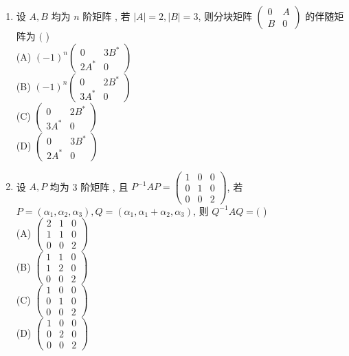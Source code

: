 \documentclass[10pt]{article}
\begin{document}
{\begin{enumerate}
  \item  设  $A, B$  均为  $n$  阶矩阵 ,  若  $|A|=2,|B|=3$,  则分块矩阵  $\left(\begin{array}{cc}0 & A \\ B & 0\end{array}\right)$  的伴随矩阵为  $($ )\\
(A) $(-1)^{n}\left(\begin{array}{cc}0 & 3 B^{*} \\ 2 A^{*} & 0\end{array}\right)$\\
(B) $(-1)^{n}\left(\begin{array}{cc}0 & 2 B^{*} \\ 3 A^{*} & 0\end{array}\right)$\\
(C) $\left(\begin{array}{cc}0 & 2 B^{*} \\ 3 A^{*} & 0\end{array}\right)$\\
(D) $\left(\begin{array}{cc}0 & 3 B^{*} \\ 2 A^{*} & 0\end{array}\right)$

  \item  设  $A, P$  均为  3  阶矩阵 ,  且  $P^{-1} A P=\left(\begin{array}{lll}1 & 0 & 0 \\ 0 & 1 & 0 \\ 0 & 0 & 2\end{array}\right)$,  若  $P=\left(\alpha_{1}, \alpha_{2}, \alpha_{3}\right), Q=\left(\alpha_{1}, \alpha_{1}+\alpha_{2}, \alpha_{3}\right)$,  则  $Q^{-1} A Q=($ )\\
(A) $\left(\begin{array}{lll}2 & 1 & 0 \\ 1 & 1 & 0 \\ 0 & 0 & 2\end{array}\right)$\\
(B) $\left(\begin{array}{lll}1 & 1 & 0 \\ 1 & 2 & 0 \\ 0 & 0 & 2\end{array}\right)$\\
(C) $\left(\begin{array}{lll}1 & 0 & 0 \\ 0 & 1 & 0 \\ 0 & 0 & 2\end{array}\right)$\\
(D) $\left(\begin{array}{lll}1 & 0 & 0 \\ 0 & 2 & 0 \\ 0 & 0 & 2\end{array}\right)$


\end{enumerate}}
\end{document}

